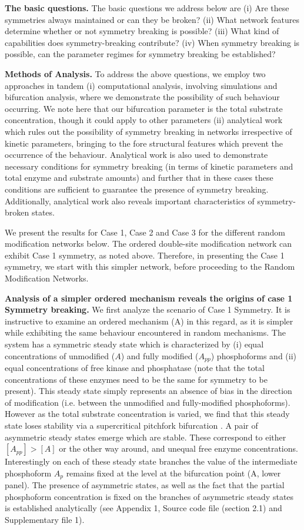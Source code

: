 \documentclass[9pt,lineno]{elife}
\begin{document}
{\bf The basic questions.} The basic questions we address below are (i) Are these symmetries always maintained or can they be broken?
(ii) What network features determine whether or not symmetry breaking is possible?
(iii) What kind of capabilities does symmetry-breaking contribute?
(iv) When symmetry breaking is possible, can the parameter regimes for symmetry breaking be established?

{\bf Methods of Analysis.}
To address the above questions,  we employ two approaches in tandem (i) computational analysis, involving simulations and bifurcation analysis, where we demonstrate the possibility of such behaviour occurring. We note here that our bifurcation parameter is the total substrate concentration, though it could apply to other parameters (ii) analytical work which rules out the possibility of symmetry breaking in networks irrespective of kinetic parameters, bringing to the fore structural features which prevent the occurrence of the behaviour. Analytical work is also used to demonstrate necessary conditions for symmetry breaking (in terms of kinetic parameters and total enzyme and substrate amounts) and further that in these cases these conditions are sufficient to guarantee the presence  of symmetry breaking. Additionally, analytical work also reveals important characteristics of symmetry-broken states.

We present the results for Case 1, Case 2 and Case 3 for the different random modification networks below. The ordered double-site modification network can exhibit Case 1 symmetry, as noted above. Therefore, in presenting the Case 1 symmetry, we start with this simpler network, before proceeding to the Random Modification Networks.
  
{\bf Analysis of a simpler ordered mechanism reveals the origins of case 1 Symmetry breaking.} We first analyze the  scenario of Case 1 Symmetry. It is instructive to examine an ordered mechanism (A) in this regard, as it is simpler while exhibiting the same behaviour encountered in random mechanisms. The system has a symmetric steady state which is characterized by (i) equal concentrations of unmodified ($A$) and fully modified ($A_{pp}$) phosphoforms and (ii) equal concentrations of free kinase and phosphatase (note that the total concentrations of these enzymes need to be the same for symmetry to be present). This steady state simply represents an absence of  bias in the direction of modification (i.e. between the unmodified and fully-modified phosphoforms). However as the total substrate concentration is varied, we find that this steady state loses stability via a supercritical pitchfork bifurcation \cite{Strogatz2001}. A pair of asymmetric steady states emerge which are stable. These correspond to either $[A_{pp}] > [A]$ or the other way around, and unequal free enzyme concentrations. Interestingly on each of these steady state branches the value of the intermediate phosphoform $A_p$ remains fixed at the level at the bifurcation point (A, lower panel). The presence of asymmetric states, as well as the fact that the partial phosphoform concentration is fixed on the branches of asymmetric steady states is established analytically (see Appendix 1, Source code file (section 2.1) and Supplementary file 1).
\end{document}
